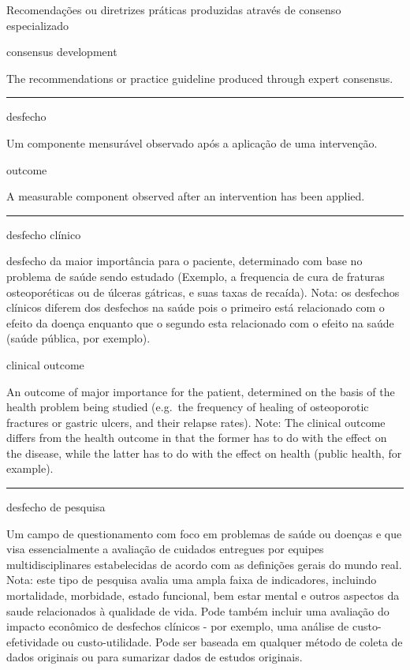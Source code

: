 \documentclass[
  openany]{book}
\begin{document}
Recomendações ou diretrizes práticas produzidas através de consenso especializado

consensus development

The recommendations or practice guideline produced through expert consensus.

\begin{center}\rule{0.5\linewidth}{0.5pt}\end{center}

desfecho

Um componente mensurável observado após a aplicação de uma intervenção.

outcome

A measurable component observed after an intervention has been applied.

\begin{center}\rule{0.5\linewidth}{0.5pt}\end{center}

desfecho clínico

desfecho da maior importância para o paciente, determinado com base no problema de saúde sendo estudado (Exemplo, a frequencia de cura de fraturas osteoporéticas ou de úlceras gátricas, e suas taxas de recaída). Nota: os desfechos clínicos diferem dos desfechos na saúde pois o primeiro está relacionado com o efeito da doença enquanto que o segundo esta relacionado com o efeito na saúde (saúde pública, por exemplo).

clinical outcome

An outcome of major importance for the patient, determined on the basis of the health problem being studied (e.g.~the frequency of healing of osteoporotic fractures or gastric ulcers, and their relapse rates). Note: The clinical outcome differs from the health outcome in that the former has to do with the effect on the disease, while the latter has to do with the effect on health (public health, for example).

\begin{center}\rule{0.5\linewidth}{0.5pt}\end{center}

desfecho de pesquisa

Um campo de questionamento com foco em problemas de saúde ou doenças e que visa essencialmente a avaliação de cuidados entregues por equipes multidisciplinares estabelecidas de acordo com as definições gerais do mundo real. Nota: este tipo de pesquisa avalia uma ampla faixa de indicadores, incluindo mortalidade, morbidade, estado funcional, bem estar mental e outros aspectos da saude relacionados à qualidade de vida. Pode também incluir uma avaliação do impacto econômico de desfechos clínicos - por exemplo, uma análise de custo-efetividade ou custo-utilidade. Pode ser baseada em qualquer método de coleta de dados originais ou para sumarizar dados de estudos originais.
\end{document}
